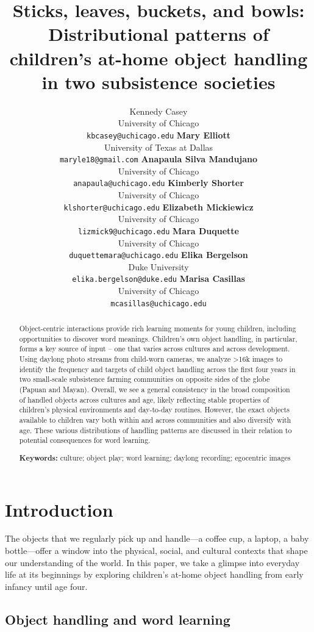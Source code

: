 \documentclass[10pt, letterpaper]{article}
\title{Sticks, leaves, buckets, and bowls: Distributional patterns of
children's at-home object handling in two subsistence societies}
\author{Kennedy Casey \\
        University of Chicago \\
        \texttt{\small{kbcasey@uchicago.edu}}
\And \textbf{Mary Elliott} \\
             University of Texas at Dallas \\
             \texttt{\small{maryle18@gmail.com}}
\And \textbf{Anapaula Silva Mandujano} \\
             University of Chicago \\
             \texttt{\small{anapaula@uchicago.edu}}   
\And \textbf{Kimberly Shorter} \\
             University of Chicago \\
             \texttt{\small{klshorter@uchicago.edu}}
\AND \textbf{Elizabeth Mickiewicz} \\
             University of Chicago \\
             \texttt{\small{lizmick9@uchicago.edu}}         
\And \textbf{Mara Duquette} \\
             University of Chicago \\
             \texttt{\small{duquettemara@uchicago.edu}}
\And \textbf{Elika Bergelson} \\
             Duke University \\
             \texttt{\small{elika.bergelson@duke.edu}}
\And \textbf{Marisa Casillas} \\
             University of Chicago \\
             \texttt{\small{mcasillas@uchicago.edu}}}
\begin{document}
\maketitle

\begin{abstract}
Object-centric interactions provide rich learning moments for young
children, including opportunities to discover word meanings. Children's
own object handling, in particular, forms a key source of input -- one
that varies across cultures and across development. Using daylong photo
streams from child-worn cameras, we analyze \textgreater16k images to
identify the frequency and targets of child object handling across the
first four years in two small-scale subsistence farming communities on
opposite sides of the globe (Papuan and Mayan). Overall, we see a
general consistency in the broad composition of handled objects across
cultures and age, likely reflecting stable properties of children's
physical environments and day-to-day routines. However, the exact
objects available to children vary both within and across communities
and also diversify with age. These various distributions of handling
patterns are discussed in their relation to potential consequences for
word learning.

\textbf{Keywords:}
culture; object play; word learning; daylong recording; egocentric
images
\end{abstract}

\hypertarget{introduction}{%
\section{Introduction}\label{introduction}}

The objects that we regularly pick up and handle---a coffee cup, a
laptop, a baby bottle---offer a window into the physical, social, and
cultural contexts that shape our understanding of the world. In this
paper, we take a glimpse into everyday life at its beginnings by
exploring children's at-home object handling from early infancy until
age four.

\hypertarget{object-handling-and-word-learning}{%
\subsection{Object handling and word
learning}\label{object-handling-and-word-learning}}
\end{document}
